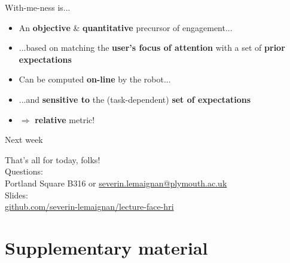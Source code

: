 \documentclass[compress]{beamer}
\makeatletter
\def\beamer@writeslidentry@miniframesoff{%
  \expandafter\beamer@ifempty\expandafter{\beamer@framestartpage}{}%
  {%
    \clearpage\beamer@notesactions%
  }
}
\newcommand*{\miniframesoff}{\let\beamer@writeslidentry=\beamer@writeslidentry@miniframesoff}
\makeatother
\begin{document}

\begin{frame}{With-me-ness is...}


    \begin{itemize}
        \item An {\bf objective} \& {\bf quantitative} precursor of engagement...
        \item ...based on matching the {\bf user's focus of attention} with a set of
            {\bf prior expectations}
        \item Can be computed {\bf on-line} by the robot...
        \item ...and {\bf sensitive to} the (task-dependent) {\bf set of
            expectations}
        \item $\Rightarrow$ {\bf relative} metric!
    \end{itemize}

\end{frame}


\miniframesoff

\begin{frame}{Next week}

\end{frame}

\begin{frame}{}
    \begin{center}
        \Large
        That's all for today, folks!\\[2em]
        \normalsize
        Questions:\\
        Portland Square B316 or \url{severin.lemaignan@plymouth.ac.uk} \\[1em]

        Slides:\\
        \href{https://github.com/severin-lemaignan/lecture-face-hri}{\small
        github.com/severin-lemaignan/lecture-face-hri}

    \end{center}
\end{frame}



\section[]{Supplementary material}
\end{document}
